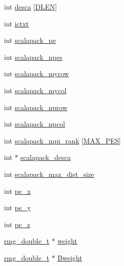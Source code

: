 \begin{DoxyCompactItemize}
\item 
int \hyperlink{struct_p_e___c_o_n_t_r_o_l_a03fff4667a50f0da092d4396dad495f2}{desca} \mbox{[}\hyperlink{_t_d_d_f_t_2_headers_2my__scalapack_8h_a55752817cfdf8aa5198801b978a7e4d7}{D\-L\-E\-N}\mbox{]}
\item 
int \hyperlink{struct_p_e___c_o_n_t_r_o_l_a61d1e089eeb96518b45adde2f79a3ed9}{ictxt}
\item 
int \hyperlink{struct_p_e___c_o_n_t_r_o_l_af84d2cc039fb9c0861cb6173028ae05e}{scalapack\-\_\-pe}
\item 
int \hyperlink{struct_p_e___c_o_n_t_r_o_l_a972437ec5ff96ae3ceecb81e98d69b25}{scalapack\-\_\-npes}
\item 
int \hyperlink{struct_p_e___c_o_n_t_r_o_l_aaaecb098341a73d7c248f8b274947db0}{scalapack\-\_\-myrow}
\item 
int \hyperlink{struct_p_e___c_o_n_t_r_o_l_a645f514fe76cc0b2d892e2e205dcb55f}{scalapack\-\_\-mycol}
\item 
int \hyperlink{struct_p_e___c_o_n_t_r_o_l_a8c06225a8570b2542be0a5572863421c}{scalapack\-\_\-nprow}
\item 
int \hyperlink{struct_p_e___c_o_n_t_r_o_l_a21cdde61aa464e7838b11b67e7453b8c}{scalapack\-\_\-npcol}
\item 
int \hyperlink{struct_p_e___c_o_n_t_r_o_l_a2356656d98708fdd460b73ea481514bf}{scalapack\-\_\-mpi\-\_\-rank} \mbox{[}\hyperlink{_t_d_d_f_t_2_headers_2params_8h_a24325c65dbec647c63a6389bcdde808c}{M\-A\-X\-\_\-\-P\-E\-S}\mbox{]}
\item 
int $\ast$ \hyperlink{struct_p_e___c_o_n_t_r_o_l_ad33a2361648db06ce8d947c076751cae}{scalapack\-\_\-desca}
\item 
int \hyperlink{struct_p_e___c_o_n_t_r_o_l_a788aff62ebbc86ae2596e4e48d6894d2}{scalapack\-\_\-max\-\_\-dist\-\_\-size}
\item 
int \hyperlink{struct_p_e___c_o_n_t_r_o_l_a5fbb8e8bb5713a4b50310e177443cb91}{pe\-\_\-x}
\item 
int \hyperlink{struct_p_e___c_o_n_t_r_o_l_a8e1af9bd70d68465b13a5daf35629627}{pe\-\_\-y}
\item 
int \hyperlink{struct_p_e___c_o_n_t_r_o_l_a12bd2f2434766c0b5bf2bf5d0823dde7}{pe\-\_\-z}
\item 
\hyperlink{rmgtypes_8h_aaa16921c14f121c56eaa42390a340db8}{rmg\-\_\-double\-\_\-t} $\ast$ \hyperlink{struct_p_e___c_o_n_t_r_o_l_a70ae6abd5bfeb98cc47fbd63981119b0}{weight}
\item 
\hyperlink{rmgtypes_8h_aaa16921c14f121c56eaa42390a340db8}{rmg\-\_\-double\-\_\-t} $\ast$ \hyperlink{struct_p_e___c_o_n_t_r_o_l_abab36fe7abd4b1f00137e1403bb21bb2}{Bweight}

\end{DoxyCompactItemize}
